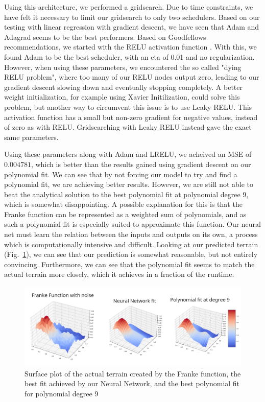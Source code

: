 \documentclass[onecolumn,10pt,cleanfoot]{asme2ej}
\begin{document}
Using this architecture, we performed a gridsearch. Due to time constraints, we have felt it necessary to limit our gridsearch to only two schedulers. Based on our testing with linear regression with gradient descent, we have seen that Adam and Adagrad seems to be the best performers. Based on Goodfellows recommendations, we started with the RELU activation function \cite[188]{gbc}. With this, we found Adam to be the best scheduler, with an eta of 0.01 and no regularization. However, when using these parameters, we encountered the so called "dying RELU problem", where too many of our RELU nodes output zero, leading to our gradient descent slowing down and eventually stopping completely. A better weight initialization, for example using Xavier Initilization, could solve this problem, but another way to circumvent this issue is to use Leaky RELU. This activation function has a small but non-zero gradient for negative values, instead of zero as with RELU. Gridsearching with Leaky RELU instead gave the exact same parameters.

Using these parameters along with Adam and LRELU, we acheived an MSE of $0.004781$, which is better than the results gained using gradient descent on our polynomial fit. We can see that by not forcing our model to try and find a polynomial fit, we are achieving better results. However, we are still not able to beat the analytical solution to the best polynomial fit at polynomial degree 9, which is somewhat disappointing. A possible explanation for this is that the Franke function can be represented as a weighted sum of polynomials, and as such a polynomial fit is especially suited to approximate this function. Our neural net must learn the relation between the inputs and outputs on its own, a process which is computationally intensive and difficult. Looking at our predicted terrain (Fig.~\ref{predterrain}), we can see that our prediction is somewhat reasonable, but not entirely convincing. Furthermore, we can see that the polynomial fit seems to match the actual terrain more closely, which it achieves in a fraction of the runtime.

\begin{figure}[h]
\centerline{\includegraphics[width=7in]{figure/Franke_fit_66x3_lam0.png}}
\caption{Surface plot of the actual terrain created by the Franke function, the best fit achieved by our Neural Network, and the best polynomial fit for polynomial degree 9}
\label{predterrain}
\end{figure}
\end{document}
